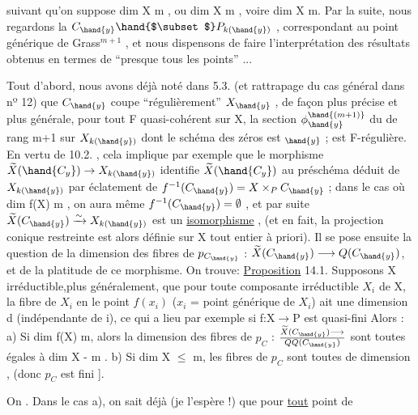 
suivant qu'on suppose  dim X \hand{$\geqslant$} m , ou  dim X \hand{$\leqslant$} m , voire dim X \hand{$<$} m.
Par la suite, nous regardons la $C_{\hand{y}}\hand{$\subset$} P_{k(\hand{y})}$\hand{)} , correspondant au point
générique  de  Grass$^{m+1}$ , et nous dispensons  de faire l'interprétation
des résultats obtenus en termes de  ``presque tous les points'' ...

Tout d'abord, nous avons déjà noté dans 5.3. (et rattrapage du
cas général dans nº 12)  que $C_{\hand{y}}$  coupe ``régulièrement'' $X_{\hand{y}}$ , de façon
plus précise et plus générale, pour tout F quasi-cohérent sur X,
la section $\phi_{\hand{y}}^{\hand{(m+1)}}$ du  de rang  m+1  sur  $X_{k(\hand{y})}$  dont le
schéma des zéros est $_{\hand{y}}$ ; est F-régulière. En vertu de 10.2. , cela
implique par exemple que le morphisme  $\widetilde{X}(\hand{C_y})\to X_{k(\hand{y})}$ identifie $\widetilde{X}(\hand{C_y})$ au préschéma
déduit de $X_{k(\hand{y})}$ par éclatement de $f^{-1}(C_{\hand{y}})= X\times_P C_{\hand{y}}$ ;   dans le cas
où  dim f(X) \hand{$\leqslant$} m ,  on  aura même  $f^{-1}(C_{\hand{y}}) = \emptyset$ , et  par suite
$\widetilde{X}(C_{\hand{y}}) \xrightarrow{\sim} X_{k(\hand{y})}$  est un \uline{isomorphisme} , (et en fait, la \hand{\unsure{)}}projection conique
restreinte  est alors définie sur X tout entier à priori). Il se pose
ensuite la question de la dimension des fibres de $p_{C_{\hand{y}}}$ : $\widetilde{X}(C_{\hand{y}}) \longrightarrow Q(C_{\hand{y}})$,
et de la platitude de ce morphisme. On trouve:
\uline{Proposition} 14.1.   Supposons X irréductible,plus
généralement, que  pour toute composante irréductible $X_i$ de X, la fibre
de $X_i$ en le point $f(x_i)$  ($x_i$ = point générique de $X_i$) ait une dimension d
(indépendante de i), ce qui a lieu par exemple  si f:X$\to$P est quasi-fini\hand{,} 
Alors :     a)  Si  dim f(X) \hand{$>$} m, alors la dimension  des fibres de
$p_C$  : $\widetilde{X}(C_{\hand{y}}) \longrightarrow \over{Q}{Q}(C_{\hand{y}})$  sont toutes égales à  dim X - m .   b)  Si dim X
$\leqslant$ m,  les fibres de $p_C$   sont toutes de dimension ,  (donc $p_C$ est fini   ].

On 
. Dans le cas a), 
  on sait déjà (je l'espère !) que pour \uline{tout}  point  de

